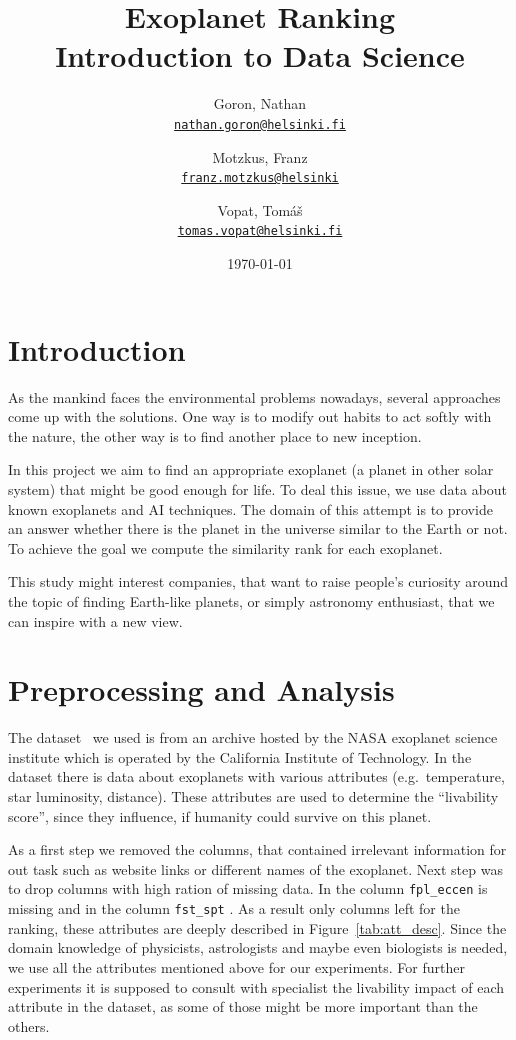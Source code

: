 \documentclass[12p]{article}
\title{Exoplanet Ranking \\\large Introduction to Data Science}
\date{\today}
\author{
    Goron, Nathan \\ \texttt{\href{mailto:nathan.goron@helsinki.fi}{nathan.goron@helsinki.fi}}
    \and 
    Motzkus, Franz \\ \texttt{\href{mailto:franz.motzkus@helsinki.fi}{franz.motzkus@helsinki}}
    \and 
    Vopat, Tomáš  \\ \texttt{\href{mailto:tomas.vopat@helsinki.fi}{tomas.vopat@helsinki.fi}}
}
\begin{document}
\maketitle

\section{Introduction}

As the mankind faces the environmental problems nowadays, several approaches come up with the solutions. One way is to modify out habits to act softly with the nature, the other way is to find another place to new inception.

In this project we aim to find an appropriate exoplanet (a planet in other solar system) that might be good enough for life. To deal this issue, we use data about known exoplanets and AI techniques. The domain of this attempt is to provide an answer whether there is the planet in the universe similar to the Earth or not. To achieve the goal we compute the similarity rank for each exoplanet.

This study might interest companies, that want to raise people's curiosity around the topic of finding Earth-like planets, or simply astronomy enthusiast, that we can inspire with a new view.


\section{Preprocessing and Analysis}
The dataset~\cite{dataset} we used is from an archive hosted by the NASA exoplanet science institute which is operated by the California Institute of Technology. In the dataset there is data about  exoplanets with  various attributes (e.g.\ temperature, star luminosity, distance). These attributes are used to determine the ``livability score'', since they influence, if humanity could survive on this planet.

As a first step we removed the columns, that contained irrelevant information for out task such as website links or different names of the exoplanet. Next step was to drop columns with high ration of missing data. In the column \verb|fpl_eccen| is  missing and in the column \verb|fst_spt| . As a result only  columns left for the ranking, these attributes are deeply described in Figure~\ref{tab:att_desc}. Since the domain knowledge of physicists, astrologists and maybe even biologists is needed, we use all the attributes mentioned above for our experiments. For further experiments it is supposed to consult with specialist the livability impact of each attribute in the dataset, as some of those might be more important than the others.
\end{document}
